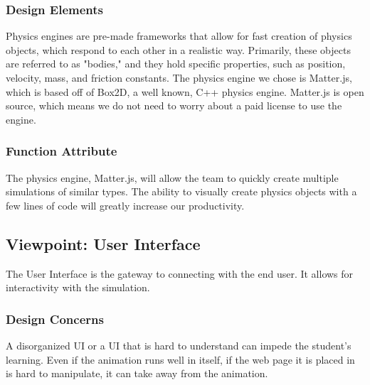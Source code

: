 \documentclass[onecolumn, draftclsnofoot,10pt, compsoc]{IEEEtran}
\begin{document}
\subsubsection{Design Elements}
Physics engines are pre-made frameworks that allow for fast creation of physics objects, which respond to each other in a realistic way. Primarily, these objects are referred to as "bodies," and they hold specific properties, such as position, velocity, mass, and friction constants. The physics engine we chose is Matter.js, which is based off of Box2D, a well known, C++ physics engine. Matter.js is open source, which means we do not need to worry about a paid license to use the engine.

\subsubsection{Function Attribute}
The physics engine, Matter.js, will allow the team to quickly create multiple simulations of similar types. The ability to visually create physics objects with a few lines of code will greatly increase our productivity.
\newline


\subsection{Viewpoint: User Interface}
The User Interface is the gateway to connecting with the end user. It allows for interactivity with the simulation.

\subsubsection{Design Concerns}
A disorganized UI or a UI that is hard to understand can impede the student's learning. Even if the animation runs well in itself, if the web page it is placed in is hard to manipulate, it can take away from the animation. 
\end{document}
